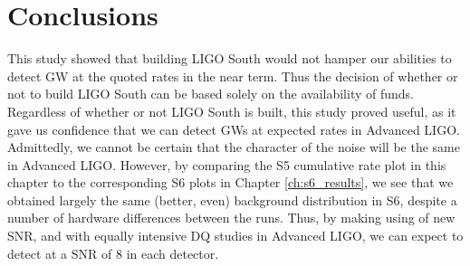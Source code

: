 \section{Conclusions}

This study showed that building \ac{LIGO} South would not hamper our abilities to detect \ac{GW} at the quoted rates in the near term. Thus the decision of whether or not to build \ac{LIGO} South can be based solely on the availability of funds. Regardless of whether or not \ac{LIGO} South is built, this study proved useful, as it gave us confidence that we can detect \acp{GW} at expected rates in Advanced LIGO. Admittedly, we cannot be certain that the character of the noise will be the same in Advanced LIGO. However, by comparing the \ac{S5} cumulative rate plot in this chapter to the corresponding \ac{S6} plots in Chapter \ref{ch:s6_results}, we see that we obtained largely the same (better, even) background distribution in \ac{S6}, despite a number of hardware differences between the runs. Thus, by making using of new \ac{SNR}, and with equally intensive \ac{DQ} studies in Advanced \ac{LIGO}, we can expect to detect at a \ac{SNR} of $8$ in each detector.

